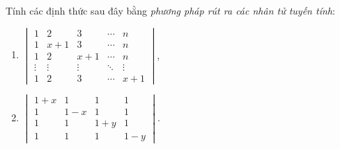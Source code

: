 \begin{exercise}
    Tính các định thức sau đây bằng \textit{phương pháp rút ra các nhân tử tuyến tính}:
    \begin{enumerate}[label = (\alph*)]
        \item $\begin{vmatrix} 1 & 2 & 3 & \cdots & n \\ 1 & x + 1 & 3 & \cdots & n \\ 1 & 2 & x + 1 & \cdots & n \\ \vdots & \vdots & \vdots & \ddots & \vdots \\ 1 & 2 & 3 & \cdots & x + 1 \end{vmatrix}$,
        \item $\begin{vmatrix} 1 + x & 1 & 1 & 1 \\ 1 & 1 - x & 1 & 1 \\ 1 & 1 & 1 + y & 1 \\ 1 & 1 & 1 & 1 - y \end{vmatrix}$.
    \end{enumerate}
\end{exercise}

